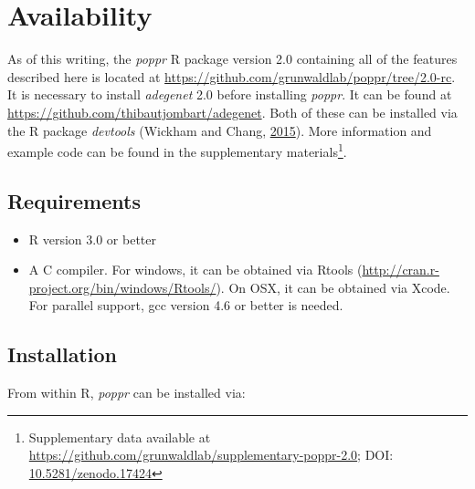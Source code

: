 \documentclass[double,12pt]{beavtex}
\providecommand{\tightlist}{%
  \setlength{\itemsep}{0pt}\setlength{\parskip}{0pt}}
\begin{document}
  \section{Availability}\label{availability}
  
  As of this writing, the \emph{poppr} R package version 2.0 containing
  all of the features described here is located at
  \url{https://github.com/grunwaldlab/poppr/tree/2.0-rc}. It is necessary
  to install \emph{adegenet} 2.0 before installing \emph{poppr}. It can be
  found at \url{https://github.com/thibautjombart/adegenet}. Both of these
  can be installed via the R package \emph{devtools} (Wickham and Chang,
  \protect\hyperlink{ref-wickham2015devtools}{2015}). More information and
  example code can be found in the supplementary materials\footnote{Supplementary
    data available at
    \url{https://github.com/grunwaldlab/supplementary-poppr-2.0}; DOI:
    \href{http://dx.doi.org/10.5281/zenodo.17424}{10.5281/zenodo.17424}}.
  
  \subsection{Requirements}\label{requirements}
  
  \begin{itemize}
  \tightlist
  \item
    R version 3.0 or better
  \item
    A C compiler. For windows, it can be obtained via Rtools
    (\url{http://cran.r-project.org/bin/windows/Rtools/}). On OSX, it can
    be obtained via Xcode. For parallel support, gcc version 4.6 or better
    is needed.
  \end{itemize}
  
  \newpage
  
  \subsection{Installation}\label{installation}
  
  From within R, \emph{poppr} can be installed via:
  
  \begin{Shaded}
  \begin{Highlighting}[]
  \NormalTok{(}\NormalTok{)}
  \NormalTok{(}\NormalTok{)}
  \NormalTok{(}\NormalTok{)}
  \NormalTok{(}\NormalTok{)}
  \end{Highlighting}
  \end{Shaded}
  
\end{document}
